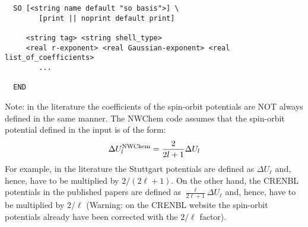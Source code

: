 %
%
\begin{verbatim}
  SO [<string name default "so basis">] \
        [print || noprint default print]

     <string tag> <string shell_type>
     <real r-exponent> <real Gaussian-exponent> <real list_of_coefficients>
        ...
     
  END
\end{verbatim}    

Note: in the literature the coefficients of the spin-orbit potentials are NOT 
always defined in the same manner. The NWChem code assumes that the spin-orbit
potential defined in the input is of the form:
\begin{equation}
\Delta U^{\rm NWChem}_{\ell} = \frac{2}{2\ell+1} \Delta U_{\ell} 
\end{equation}
For example, in the literature the Stuttgart potentials are defined as 
$\Delta U_{\ell}$ and, hence, have to be multiplied by $2/(2{\ell}+1)$. On the 
other hand, the CRENBL potentials in the published papers are defined as 
$\frac{\ell}{2\ell+1} \Delta U_{\ell}$ and, hence, have to be multiplied by 
$2/{\ell}$ (Warning: on the CRENBL website the spin-orbit potentials already
have been corrected with the $2/{\ell}$ factor).


